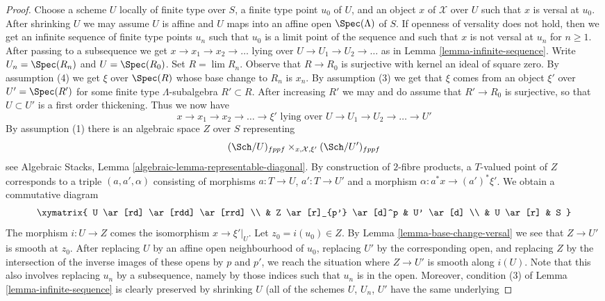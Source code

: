 \begin{proof}
Choose a scheme $U$ locally of finite type over $S$,
a finite type point $u_0$ of $U$, and an object $x$ of $\mathcal{X}$
over $U$ such that $x$ is versal at $u_0$. After shrinking
$U$ we may assume $U$ is affine and $U$ maps into an affine open
$\Spec(\Lambda)$ of $S$. If openness of versality does not hold,
then we get an infinite sequence of finite type points $u_n$ such
that $u_0$ is a limit point of the sequence and such that $x$ is not versal
at $u_n$ for $n \geq 1$. After passing to a subsequence we
get $x \to x_1 \to x_2 \to \ldots$ lying over
$U \to U_1 \to U_2 \to \ldots$ as in Lemma \ref{lemma-infinite-sequence}.
Write $U_n = \Spec(R_n)$ and $U = \Spec(R_0)$.
Set $R = \lim R_n$. Observe that $R \to R_0$ is surjective
with kernel an ideal of square zero. By assumption (4)
we get $\xi$ over $\Spec(R)$ whose base change to $R_n$ is $x_n$.
By assumption (3) we get that $\xi$ comes from an object $\xi'$ over
$U' = \Spec(R')$ for some finite type $\Lambda$-subalgebra
$R' \subset R$. After increasing $R'$ we may and do assume that
$R' \to R_0$ is surjective, so that $U \subset U'$ is a first order thickening.
Thus we now have
$$
x \to x_1 \to x_2 \to \ldots \to \xi'
\text{ lying over }
U \to U_1 \to U_2 \to \ldots \to U'
$$
By assumption (1) there is an algebraic space $Z$ over $S$ representing
$$
(\Sch/U)_{fppf} \times_{x, \mathcal{X}, \xi'} (\Sch/U')_{fppf}
$$
see Algebraic Stacks, Lemma \ref{algebraic-lemma-representable-diagonal}.
By construction of $2$-fibre products, a $T$-valued point of $Z$
corresponds to a triple $(a, a', \alpha)$ consisting of morphisms
$a : T \to U$, $a' : T \to U'$ and a morphism $\alpha : a^*x \to (a')^*\xi'$.
We obtain a commutative diagram
$$
\xymatrix{
U \ar[rd] \ar[rdd] \ar[rrd] \\
& Z \ar[r]_{p'} \ar[d]^p & U' \ar[d] \\
& U \ar[r] & S
}
$$
The morphism $i : U \to Z$ comes the isomorphism $x \to \xi'|_U$.
Let $z_0 = i(u_0) \in Z$. By Lemma \ref{lemma-base-change-versal}
we see that $Z \to U'$ is smooth at $z_0$. After replacing $U$ by an
affine open neighbourhood of $u_0$, replacing $U'$ by the corresponding
open, and replacing $Z$ by the intersection of the inverse images
of these opens by $p$ and $p'$, we reach the situation where
$Z \to U'$ is smooth along $i(U)$. Note that this
also involves replacing $u_n$ by a subsequence, namely
by those indices such that $u_n$ is in the open. Moreover, condition
(3) of Lemma \ref{lemma-infinite-sequence}
is clearly preserved by shrinking $U$
(all of the schemes $U$, $U_n$, $U'$ have the same underlying

\end{proof}
